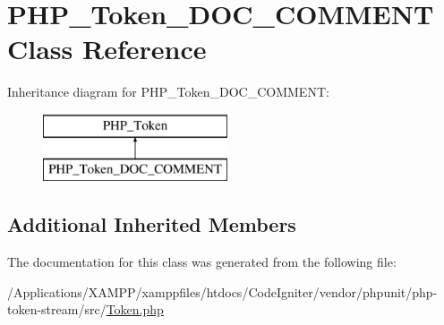 \hypertarget{class_p_h_p___token___d_o_c___c_o_m_m_e_n_t}{}\section{P\+H\+P\+\_\+\+Token\+\_\+\+D\+O\+C\+\_\+\+C\+O\+M\+M\+E\+NT Class Reference}
\label{class_p_h_p___token___d_o_c___c_o_m_m_e_n_t}
Inheritance diagram for P\+H\+P\+\_\+\+Token\+\_\+\+D\+O\+C\+\_\+\+C\+O\+M\+M\+E\+NT\+:\begin{figure}[H]
\begin{center}
\leavevmode
\includegraphics[height=2.000000cm]{class_p_h_p___token___d_o_c___c_o_m_m_e_n_t}
\end{center}
\end{figure}
\subsection*{Additional Inherited Members}


The documentation for this class was generated from the following file\+:\begin{DoxyCompactItemize}
\item 
/\+Applications/\+X\+A\+M\+P\+P/xamppfiles/htdocs/\+Code\+Igniter/vendor/phpunit/php-\/token-\/stream/src/\mbox{\hyperlink{_token_8php}{Token.\+php}}\end{DoxyCompactItemize}
